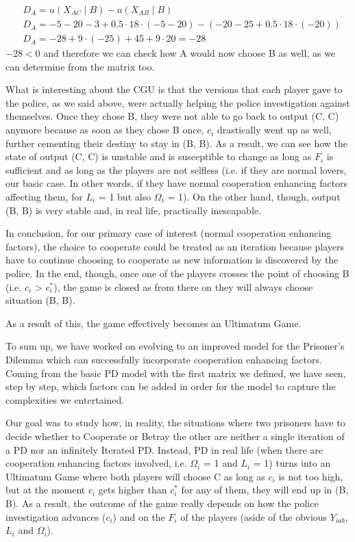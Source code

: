 \documentclass[11pt, a4paper]{article}
\begin{document}
$$
\begin{aligned}
& D_A=u\left(X_{A C} \mid B\right)-u\left(X_{A B} \mid B\right) \\
& D_A=-5-20-3+0.5 \cdot 18 \cdot(-5-20)-(-20-25+0.5 \cdot 18 \cdot(-20)) \\
& D_A=-28+9 \cdot(-25)+45+9 \cdot 20=-28
\end{aligned}
$$
$-28<0$ and therefore we can check how A would now choose B as well, as we can determine from the matrix too.

What is interesting about the CGU is that the versions that each player gave to the police, as we said above, were actually helping the police investigation against themselves. Once they chose B, they were not able to go back to output (C, C) anymore because as soon as they chose B once, $c_i$ drastically went up as well, further cementing their destiny to stay in (B, B). As a result, we can see how the state of output (C, C) is unstable and is susceptible to change as long as $F_i$ is sufficient and as long as the players are not selfless (i.e. if they are normal lovers, our basic case. In other words, if they have normal cooperation enhancing factors affecting them, for $L_i$ = 1 but also $\Omega_i$ = 1). On the other hand, though, output (B, B) is very stable and, in real life, practically inescapable.

In conclusion, for our primary case of interest (normal cooperation enhancing factors), the choice to cooperate could be treated as an iteration because players have to continue choosing to cooperate as new information is discovered by the police. In the end, though, once one of the players crosses the point of choosing B (i.e. $c_i$ > $c_i^*$), the game is closed as from there on they will always choose situation (B, B).

As a result of this, the game effectively becomes an Ultimatum Game.

To sum up, we have worked on evolving to an improved model for the Prisoner's
Dilemma which can successfully incorporate cooperation enhancing factors.
Coming from the basic PD model with the first matrix we defined, we have seen, step by step, which factors can be added in order for the model to capture the complexities we entertained.

Our goal was to study how, in reality, the situations where two prisoners have to decide whether to Cooperate or Betray the other are neither a single iteration of a PD nor an infinitely Iterated PD. Instead, PD in real life (when there are cooperation enhancing factors involved, i.e. $\Omega_i$ = 1 and $L_i$ = 1) turns into an Ultimatum Game where both players will choose C as long as $c_i$ is not too high, but at the moment $c_i$ gets higher than $c_i^*$ for any of them, they will end up in (B, B). As a result, the outcome of the game really depends on how the police investigation advances ($c_i$) and on the $F_i$ of the players (aside of the obvious $Y_{iab}$, $L_i$ and $\Omega_i$).

\nocite{*}
\printbibliography
\end{document}
